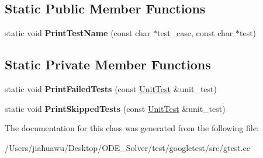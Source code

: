 \subsection*{Static Public Member Functions}
\begin{DoxyCompactItemize}
\item 
\mbox{\label{classtesting_1_1internal_1_1_pretty_unit_test_result_printer_a5b60a9aed1db02837b11450f6e8d0f71}} 
static void {\bfseries Print\+Test\+Name} (const char $\ast$test\+\_\+case, const char $\ast$test)
\end{DoxyCompactItemize}
\subsection*{Static Private Member Functions}
\begin{DoxyCompactItemize}
\item 
\mbox{\label{classtesting_1_1internal_1_1_pretty_unit_test_result_printer_aca5a9dc08998948e293b307d931b3f86}} 
static void {\bfseries Print\+Failed\+Tests} (const \mbox{\hyperlink{classtesting_1_1_unit_test}{Unit\+Test}} \&unit\+\_\+test)
\item 
\mbox{\label{classtesting_1_1internal_1_1_pretty_unit_test_result_printer_a2916db1a4f24dd9d07a7ec490a8a9ace}} 
static void {\bfseries Print\+Skipped\+Tests} (const \mbox{\hyperlink{classtesting_1_1_unit_test}{Unit\+Test}} \&unit\+\_\+test)
\end{DoxyCompactItemize}


The documentation for this class was generated from the following file\+:\begin{DoxyCompactItemize}
\item 
/\+Users/jiahuawu/\+Desktop/\+O\+D\+E\+\_\+\+Solver/test/googletest/src/gtest.\+cc\end{DoxyCompactItemize}
